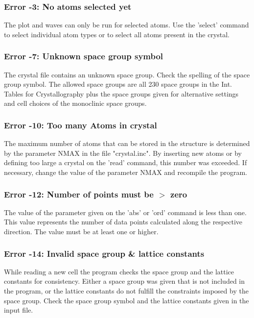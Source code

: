 \subsubsection{Error -3: No atoms selected yet}
\par
The plot and waves can only be run for selected atoms. Use the 'select' 
command to select individual atom types or to select all atoms present 
in the crystal. 
\subsubsection{Error -7: Unknown space group symbol}
\par
The crystal file contains an unknown space group. Check the spelling of 
the space group symbol. The allowed space groups are all 230 space 
groups in the Int. Tables for Crystallography plus the space groups 
given for alternative settings and cell choices of the monoclinic 
space groups. 
\subsubsection{Error -10: Too many Atoms in crystal}
\par
The maximum number of atoms that can be stored in the structure 
is determined by the parameter NMAX in the file "crystal.inc". 
By inserting new atoms or by defining too large a crystal on the 
'read' command, this number was exceeded. If necessary, change the 
value of the parameter NMAX and recompile the program. 
\subsubsection{Error -12: Number of points must be $> $ zero}
\par
The value of the parameter given on the 'abs' or 'ord' command is 
less than one. This value represents the number of data points 
calculated along the respective direction. 
The value must be at least one or higher. 
\subsubsection{Error -14: Invalid space group \& lattice constants}
\par
While reading a new cell the program checks the space group and the 
lattice constants for consistency. Either a space group was given 
that is not included in the program, or the lattice constants do 
not fulfill the constraints imposed by the space group. Check the 
space group symbol and the lattice constants given in the input file. 
